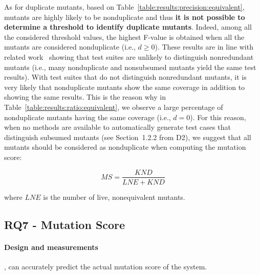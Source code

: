 As for duplicate mutants, based on Table~\ref{table:results:precision:equivalent}, 
mutants are highly likely to be nonduplicate and thus \textbf{it is not possible to determine a threshold to identify duplicate mutants}. Indeed, among all the considered threshold values, the highest F-value is obtained when all the mutants are considered nonduplicate (i.e., $d\ge0$). These results are in line with related work~\cite{shin2017theoretical} showing that test suites are unlikely to distinguish nonredundant mutants (i.e., many nonduplicate and nonsubsumed mutants yield the same test results). 
With test suites that do not distinguish nonredundant mutants, it is very likely that nonduplicate mutants show the same coverage in addition to showing the same results. This is the reason why in Table~\ref{table:results:ratio:equivalent}, we observe a large percentage of nonduplicate mutants having the same coverage (i.e., $d=0$). For this reason, when no methods are available to automatically generate test cases that distinguish subsumed mutants (see Section~1.2.2 from D2), we suggest that all mutants should be considered as nonduplicate when computing the mutation score:

\begin{equation}
\label{equation:ms:exp}
\mathit{MS} = \frac{\mathit{KND}}{\mathit{LNE}+\mathit{KND}}
\end{equation}

where $\mathit{LNE}$ is the number of live, nonequivalent mutants.







\subsection{RQ7 - \APPR Mutation Score}

\paragraph{Design and measurements}

,
can accurately predict
the actual mutation score of the system.

